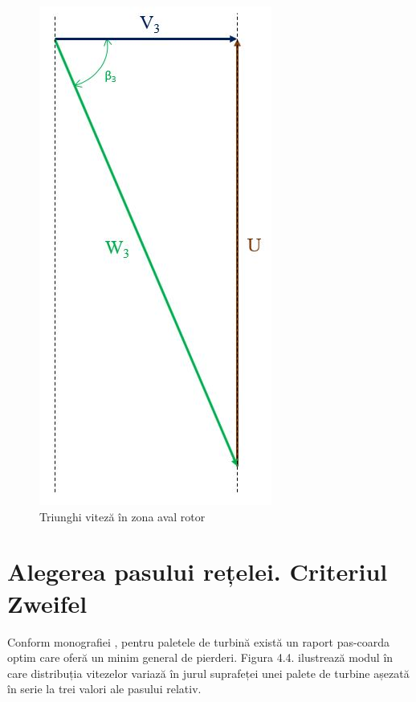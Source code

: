 \begin{figure}[h]
	\centering
	\includegraphics[scale=0.55]{figures/triunghi_viteza_ZAR.jpg}
	\caption{Triunghi viteză în zona aval rotor}
	\label{Triunghi viteză în zona aval rotor}
\end{figure}

\clearpage

\section{Alegerea pasului rețelei. Criteriul Zweifel}

Conform monografiei \cite[p.102]{hall2013fluid}, pentru paletele de turbină există un raport pas-coarda optim care oferă un minim general de pierderi. Figura 4.4. ilustrează modul în care distribuția vitezelor variază în jurul suprafeței unei palete de turbine așezată în serie la trei valori ale pasului relativ.

